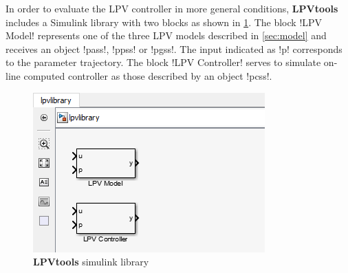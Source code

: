 \documentclass[fleqn,11pt]{article}
\newcommand{\lpvtool}{\textbf{LPVtools}\xspace}
\begin{document}
In order to evaluate the LPV controller in more general conditions, \lpvtool includes a Simulink library with two blocks as shown in \cref{fig:simulink}. The block !LPV Model! represents one of the three LPV models described in \cref{sec:model} and receives an object !pass!, !ppss! or !pgss!. The input indicated as !p! corresponds to the parameter trajectory. The block !LPV Controller! serves to simulate on-line computed controller as those described by an object !pcss!.

\begin{figure}
  \centering
  \includegraphics[scale=1]{figs/fig_library.png}
  \caption{\lpvtool simulink library}\label{fig:simulink}
\end{figure}





\end{document}
